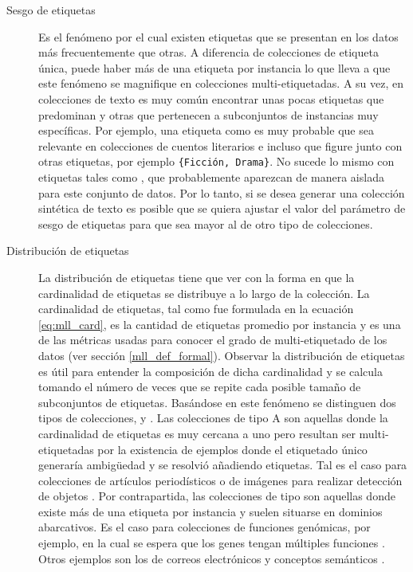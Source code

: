 \begin{description}

   \item[Sesgo de etiquetas] Es el fenómeno por el cual existen etiquetas que se
      presentan en los datos más frecuentemente que otras. A diferencia de
      colecciones de etiqueta única, puede haber más de una etiqueta por
      instancia lo que lleva a que este fenómeno se magnifique en colecciones
      multi-etiquetadas. A su vez, en colecciones de texto es muy común
      encontrar unas pocas etiquetas que predominan y otras que pertenecen a
      subconjuntos de instancias muy específicas. Por ejemplo, una etiqueta como
       es muy probable que sea relevante en
      colecciones de cuentos literarios e incluso que figure junto con otras
      etiquetas, por ejemplo \texttt{\{Ficción, Drama\}}.  No sucede lo mismo
      con etiquetas tales como , que probablemente
      aparezcan de manera aislada para este conjunto de datos.  Por lo tanto, si
      se desea generar una colección sintética de texto es posible que se quiera
      ajustar el valor del parámetro de sesgo de etiquetas para que sea mayor al
      de otro tipo de colecciones.

   \item[Distribución de etiquetas] La distribución de etiquetas tiene que ver
      con la forma en que la cardinalidad de etiquetas se distribuye a lo largo
      de la colección. La cardinalidad de etiquetas, tal como fue formulada en
      la ecuación \ref{eq:mll_card}, es la cantidad de etiquetas promedio por
      instancia y es una de las métricas usadas para conocer el grado de
      multi-etiquetado de los datos (ver sección \ref{mll_def_formal}). Observar
      la distribución de etiquetas es útil para entender la composición de dicha
      cardinalidad y se calcula tomando el número de veces que se repite cada
      posible tamaño de subconjuntos de etiquetas. Basándose en este fenómeno se
      distinguen dos tipos de colecciones,  y . Las
      colecciones de tipo A son aquellas donde la cardinalidad de etiquetas es
      muy cercana a uno pero resultan ser multi-etiquetadas por la existencia de
      ejemplos donde el etiquetado único generaría ambigüedad y se resolvió
      añadiendo etiquetas. Tal es el caso para colecciones de artículos
      periodísticos \cite{lang_newsweeder_1995} o de imágenes para realizar
      detección de objetos \cite{boutell_learning_2004}. Por contrapartida, las
      colecciones de tipo  son aquellas donde existe más de una
      etiqueta por instancia y suelen situarse en dominios abarcativos. Es el
      caso para colecciones de funciones genómicas, por ejemplo, en la cual se
      espera que los genes tengan múltiples funciones
      \cite{diplaris_protein_2005}.  Otros ejemplos son los de correos
      electrónicos \cite{hutchison_enron_2004} y conceptos semánticos
      \cite{snoek_challenge_2006}.


\end{description}
